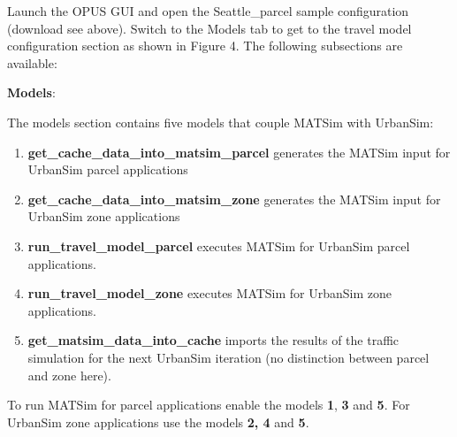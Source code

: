 Launch the OPUS GUI and open the Seattle\_parcel sample configuration  (download see above). Switch to the Models tab to get to the travel  model configuration section as shown in Figure 4. The following  subsections are available:

\textbf{Models}:

The models section contains five models that couple MATSim with UrbanSim:
\begin{enumerate}
	\item \textbf{get\_cache\_data\_into\_matsim\_parcel} generates the MATSim input for UrbanSim parcel applications
	\item \textbf{get\_cache\_data\_into\_matsim\_zone} generates the MATSim input for UrbanSim zone applications
	\item \textbf{run\_travel\_model\_parcel }executes MATSim for UrbanSim parcel applications.
	\item \textbf{run\_travel\_model\_zone} executes MATSim for UrbanSim zone applications.
	\item \textbf{get\_matsim\_data\_into\_cache} imports the results of the traffic simulation for the next UrbanSim iteration (no distinction between parcel and zone here).
\end{enumerate}

To run MATSim for parcel applications enable the models \textbf{1},\textbf{ 3} and \textbf{5}. For UrbanSim zone applications use the models \textbf{2, 4} and \textbf{5}.

